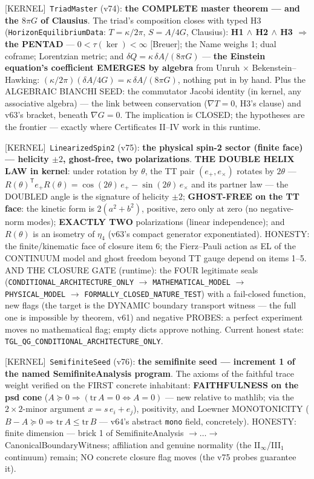 \documentclass[11pt]{article}
\providecommand{\kernelmk}[1]{\textsf{[KERNEL]}~\texttt{#1}}\providecommand{\knownmk}[1]{\textsf{[KNOWN]}~{#1}}\providecommand{\statusmk}[1]{\textsf{[#1]}}
\theoremstyle{definition}\newtheorem{deriv}{Derivation}
\begin{document}
\kernelmk{TriadMaster} (v74): \textbf{the COMPLETE master theorem --- and the $8\pi G$ of Clausius}. The triad's composition closes with typed H3 (\texttt{HorizonEquilibriumData}: $T=\kappa/2\pi$, $S=A/4G$, Clausius): \textbf{H1 $\wedge$ H2 $\wedge$ H3 $\Rightarrow$ the PENTAD} --- $0<\tau(\ker)<\infty$ [Breuer]; the Name weighs 1; dual coframe; Lorentzian metric; and $\delta Q=\kappa\,\delta A/(8\pi G)$ --- \textbf{the Einstein equation's coefficient EMERGES by algebra} from Unruh $\times$ Bekenstein--Hawking: $(\kappa/2\pi)(\delta A/4G)=\kappa\,\delta A/(8\pi G)$, nothing put in by hand. Plus the ALGEBRAIC BIANCHI SEED: the commutator Jacobi identity (in kernel, any associative algebra) --- the link between conservation ($\nabla T=0$, H3's clause) and v63's bracket, beneath $\nabla G=0$. The implication is CLOSED; the hypotheses are the frontier --- exactly where Certificates II--IV work in this runtime.

\kernelmk{LinearizedSpin2} (v75): \textbf{the physical spin-2 sector (finite face) --- helicity $\pm2$, ghost-free, two polarizations}. \textbf{THE DOUBLE HELIX LAW in kernel}: under rotation by $\theta$, the TT pair $(e_+,e_\times)$ rotates by $2\theta$ --- $R(\theta)^{\mathsf T}e_+R(\theta)=\cos(2\theta)\,e_+-\sin(2\theta)\,e_\times$ and its partner law --- the DOUBLED angle is the signature of helicity $\pm2$; \textbf{GHOST-FREE on the TT face}: the kinetic form is $2(a^2+b^2)$, positive, zero only at zero (no negative-norm modes); \textbf{EXACTLY TWO} polarizations (linear independence); and $R(\theta)$ is an isometry of $\eta_4$ (v63's compact generator exponentiated). HONESTY: the finite/kinematic face of closure item 6; the Fierz--Pauli action as EL of the CONTINUUM model and ghost freedom beyond TT gauge depend on items 1--5. AND THE CLOSURE GATE (runtime): the FOUR legitimate seals (\texttt{CONDITIONAL\_ARCHITECTURE\_ONLY} $\to$ \texttt{MATHEMATICAL\_MODEL} $\to$ \texttt{PHYSICAL\_MODEL} $\to$ \texttt{FORMALLY\_CLOSED\_NATURE\_TEST}) with a fail-closed function, new flags (the target is the DYNAMIC boundary transport witness --- the full one is impossible by theorem, v61) and negative PROBES: a perfect experiment moves no mathematical flag; empty dicts approve nothing. Current honest state: \texttt{TGL\_QG\_CONDITIONAL\_ARCHITECTURE\_ONLY}.

\kernelmk{SemifiniteSeed} (v76): \textbf{the semifinite seed --- increment 1 of the named SemifiniteAnalysis program}. The axioms of the faithful trace weight verified on the FIRST concrete inhabitant: \textbf{FAITHFULNESS on the psd cone} ($A\succeq0\Rightarrow(\mathrm{tr}\,A=0\Leftrightarrow A=0)$ --- new relative to mathlib; via the $2\times2$-minor argument $x=s\,e_i+e_j$), positivity, and Loewner MONOTONICITY ($B-A\succeq0\Rightarrow\mathrm{tr}\,A\le\mathrm{tr}\,B$ --- v64's abstract \texttt{mono} field, concretely). HONESTY: finite dimension --- brick 1 of SemifiniteAnalysis $\to\dots\to$ CanonicalBoundaryWitness; affiliation and genuine normality (the II$_\infty$/III$_1$ continuum) remain; NO concrete closure flag moves (the v75 probes guarantee it).
\end{document}
